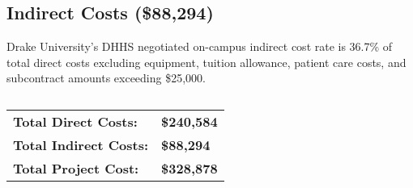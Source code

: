 \documentclass[11pt]{article}
\begin{document}
	\subsection*{Indirect Costs (\$88,294)}
	Drake University's DHHS negotiated on-campus indirect cost rate is 36.7\% of total direct costs excluding equipment, tuition allowance, patient care costs, and subcontract amounts exceeding \$25,000.


	\subsection*{}

\begin{tabular}{ll}
	{\large \bf Total Direct Costs:} & {\large \bf \$240,584 }\\
	{\large \bf Total Indirect Costs:} & {\large \bf \$88,294}\\
	{\large \bf Total Project Cost:} & {\large \bf \$328,878}
\end{tabular}
\end{document}
